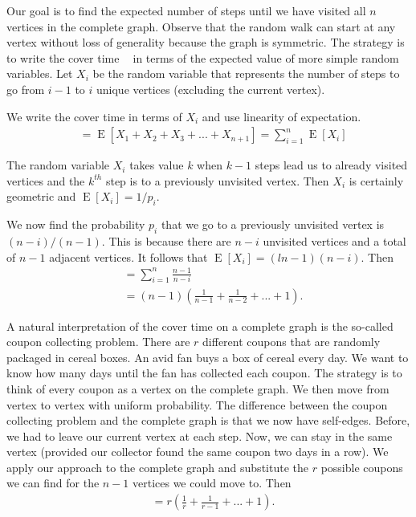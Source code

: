 \documentclass[12pt]{article}
\theoremstyle{definition}
\DeclareMathOperator{\E}{\mathrm{E}}		     %
\DeclareMathOperator{\pr}{\mathrm{P}}		     %
\DeclareMathOperator{\tcov}{t_\textrm{cov}}      %
\begin{document}
Our goal is to find the expected number of steps until we have visited all
$n$ vertices in the complete graph.
Observe that the random walk can start at any vertex without loss of generality
because the graph is symmetric.
The strategy is to write the cover time $\tcov$ in terms of the expected
value of more simple random variables.
Let $X_i$ be the random variable that represents the number of steps to go
from $i-1$ to $i$ unique vertices (excluding the current vertex).

We write the cover time in terms of $X_i$ and use linearity of expectation.
\begin{align}
\tcov&= \E[X_1+X_2+X_3+...+X_{n+1}] = \sum_{i=1}^n \E[X_i] \nonumber
\end{align}

The random variable $X_i$ takes value $k$ when $k-1$ steps lead us to
already visited vertices and the $k^{th}$ step is to a previously unvisited vertex.
Then $X_i$ is certainly geometric and $\E[X_i] = 1/p_i$. 

\begin{comment}
It follows that $X_i$ is geometric with distribution
\begin{align}
\pr(X_i = k) = (1-p_i)^{k-1}p_i, \nonumber
\end{align}
where $p_i$ is the probability of moving to a previously unvisited vertex.
\end{comment}
We now find the probability $p_i$ that 
we go to a previously unvisited vertex is $(n-i)/(n-1)$.
This is because there are $n-i$ unvisited vertices and a total of $n-1$ adjacent vertices.
It follows that $\E[X_i] = (ln-1)(n-i)$.
Then
\begin{align}
\tcov&=   \sum_{i=1}^n \frac{n-1}{n-i} \nonumber \\
&=  (n-1) \left(\frac{1}{n-1}+\frac{1}{n-2}+...+1\right). \nonumber
\end{align}

A natural interpretation of the cover time on a complete graph is 
the so-called coupon collecting problem.
There are $r$ different coupons that are randomly packaged in cereal boxes.
An avid fan buys a box of cereal every day.
We want to know how many days until the fan has collected each coupon.
The strategy is to think of every coupon as a vertex on the complete graph.
We then move from vertex to vertex with uniform probability.
The difference between the coupon collecting problem and the complete graph
is that we now have self-edges.
Before, we had to leave our current vertex at each step.
Now, we can stay in the same vertex (provided our collector found the same coupon
two days in a row).
We apply our approach to the complete graph and substitute the $r$ possible coupons
we can find for the $n-1$ vertices we could move to.
Then
\begin{align}
\tcov&=  r \left(\frac{1}{r}+\frac{1}{r-1}+...+1\right). \nonumber
\end{align}
\end{document}
